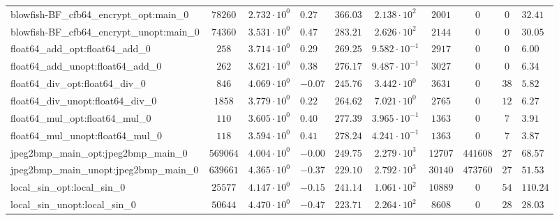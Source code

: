 \begin{tabular}{|l|c|HHc|c|c|c|cH|}
blowfish-BF\_cfb64\_encrypt\_opt:main\_0        & $ 78260    $ & $ 2.732 \cdot 10^{0} $ & $ 0.27  $ & $ 366.03 $ & $ 2.138 \cdot 10^{2}  $ & $ 2001   $ & $ 0       $ & $ 0   $ & $ 32.41   $ \\
blowfish-BF\_cfb64\_encrypt\_unopt:main\_0      & $ 74360    $ & $ 3.531 \cdot 10^{0} $ & $ 0.47  $ & $ 283.21 $ & $ 2.626 \cdot 10^{2}  $ & $ 2144   $ & $ 0       $ & $ 0   $ & $ 30.05   $ \\
float64\_add\_opt:float64\_add\_0               & $ 258      $ & $ 3.714 \cdot 10^{0} $ & $ 0.29  $ & $ 269.25 $ & $ 9.582 \cdot 10^{-1} $ & $ 2917   $ & $ 0       $ & $ 0   $ & $ 6.00    $ \\
float64\_add\_unopt:float64\_add\_0             & $ 262      $ & $ 3.621 \cdot 10^{0} $ & $ 0.38  $ & $ 276.17 $ & $ 9.487 \cdot 10^{-1} $ & $ 3027   $ & $ 0       $ & $ 0   $ & $ 6.34    $ \\
float64\_div\_opt:float64\_div\_0               & $ 846      $ & $ 4.069 \cdot 10^{0} $ & $ -0.07 $ & $ 245.76 $ & $ 3.442 \cdot 10^{0}  $ & $ 3631   $ & $ 0       $ & $ 38  $ & $ 5.82    $ \\
float64\_div\_unopt:float64\_div\_0             & $ 1858     $ & $ 3.779 \cdot 10^{0} $ & $ 0.22  $ & $ 264.62 $ & $ 7.021 \cdot 10^{0}  $ & $ 2765   $ & $ 0       $ & $ 12  $ & $ 6.27    $ \\
float64\_mul\_opt:float64\_mul\_0               & $ 110      $ & $ 3.605 \cdot 10^{0} $ & $ 0.40  $ & $ 277.39 $ & $ 3.965 \cdot 10^{-1} $ & $ 1363   $ & $ 0       $ & $ 7   $ & $ 3.91    $ \\
float64\_mul\_unopt:float64\_mul\_0             & $ 118      $ & $ 3.594 \cdot 10^{0} $ & $ 0.41  $ & $ 278.24 $ & $ 4.241 \cdot 10^{-1} $ & $ 1363   $ & $ 0       $ & $ 7   $ & $ 3.87    $ \\
jpeg2bmp\_main\_opt:jpeg2bmp\_main\_0           & $ 569064   $ & $ 4.004 \cdot 10^{0} $ & $ -0.00 $ & $ 249.75 $ & $ 2.279 \cdot 10^{3}  $ & $ 12707  $ & $ 441608  $ & $ 27  $ & $ 68.57   $ \\
jpeg2bmp\_main\_unopt:jpeg2bmp\_main\_0         & $ 639661   $ & $ 4.365 \cdot 10^{0} $ & $ -0.37 $ & $ 229.10 $ & $ 2.792 \cdot 10^{3}  $ & $ 30140  $ & $ 473760  $ & $ 27  $ & $ 51.53   $ \\
local\_sin\_opt:local\_sin\_0                   & $ 25577    $ & $ 4.147 \cdot 10^{0} $ & $ -0.15 $ & $ 241.14 $ & $ 1.061 \cdot 10^{2}  $ & $ 10889  $ & $ 0       $ & $ 54  $ & $ 110.24  $ \\
local\_sin\_unopt:local\_sin\_0                 & $ 50644    $ & $ 4.470 \cdot 10^{0} $ & $ -0.47 $ & $ 223.71 $ & $ 2.264 \cdot 10^{2}  $ & $ 8608   $ & $ 0       $ & $ 28  $ & $ 28.03   $ \\

\end{tabular}
